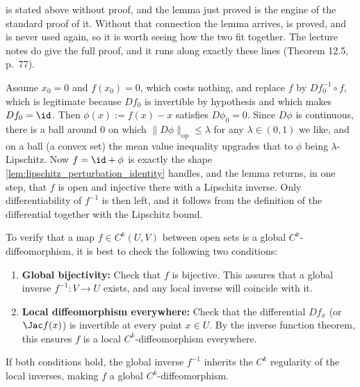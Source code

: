 %
\begin{ainote}
 is stated above without proof, and the lemma just proved is
the engine of the standard proof of it. Without that connection the lemma arrives, is proved,
and is never used again, so it is worth seeing how the two fit together. The lecture notes do
give the full proof, and it runs along exactly these lines (Theorem 12.5, p.\ 77).

Assume $x_0 = 0$ and $f(x_0) = 0$, which costs nothing, and replace $f$ by $Df_0^{-1}\circ f$,
which is legitimate because $Df_0$ is invertible by hypothesis and which makes $Df_0 = \id$.
Then $\phi(x) := f(x) - x$ satisfies $D\phi_0 = 0$. Since $D\phi$ is continuous, there is a ball
around $0$ on which $\|D\phi\|_{\mathrm{op}} \leq \lambda$ for any $\lambda \in (0,1)$ we like, and on a ball
(a convex set) the mean value inequality upgrades that to $\phi$ being $\lambda$-Lipschitz. Now
$f = \id + \phi$ is exactly the shape \cref{lem:lipschitz_perturbation_identity} handles, and the
lemma returns, in one step, that $f$ is open and injective there with a Lipschitz inverse. Only
differentiability of $f^{-1}$ is then left, and it follows from the definition of the
differential together with the Lipschitz bound.
\end{ainote}

\begin{remark}
\label{rem:global_diffeomorphism_check}
To verify that a map $f \in C^k(U, V)$ between open sets is a global $C^k$-diffeomorphism, it is best to check the following two conditions:
\begin{enumerate}[label=\textbf{(\alph*)}]
  \item \textbf{Global bijectivity:} Check that $f$ is bijective. This assures that a global inverse $f^{-1} : V \to U$ exists, and any local inverse will coincide with it.
  \item \textbf{Local diffeomorphism everywhere:} Check that the differential $Df_x$ (or $\Jac f(x)$) is invertible at every point $x \in U$. By the inverse function theorem, this ensures $f$ is a local $C^k$-diffeomorphism everywhere.
\end{enumerate}
If both conditions hold, the global inverse $f^{-1}$ inherits the $C^k$ regularity of the local inverses, making $f$ a global $C^k$-diffeomorphism.
\end{remark}

